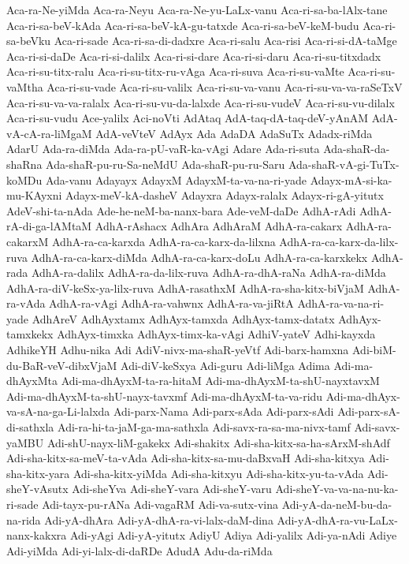 {Aca-ra-Ne-yiMda
Aca-ra-Neyu
Aca-ra-Ne-yu-LaLx-vanu
Aca-ri-sa-ba-lAlx-tane
Aca-ri-sa-beV-kAda
Aca-ri-sa-beV-kA-gu-tatxde
Aca-ri-sa-beV-keM-budu
Aca-ri-sa-beVku
Aca-ri-sade
Aca-ri-sa-di-dadxre
Aca-ri-salu
Aca-risi
Aca-ri-si-dA-taMge
Aca-ri-si-daDe
Aca-ri-si-dalilx
Aca-ri-si-dare
Aca-ri-si-daru
Aca-ri-su-titxdadx
Aca-ri-su-titx-ralu
Aca-ri-su-titx-ru-vAga
Aca-ri-suva
Aca-ri-su-vaMte
Aca-ri-su-vaMtha
Aca-ri-su-vade
Aca-ri-su-valilx
Aca-ri-su-va-vanu
Aca-ri-su-va-va-raSeTxV
Aca-ri-su-va-va-ralalx
Aca-ri-su-vu-da-lalxde
Aca-ri-su-vudeV
Aca-ri-su-vu-dilalx
Aca-ri-su-vudu
Ace-yalilx
Aci-noVti
AdAtaq
AdA-taq-dA-taq-deV-yAnAM
AdA-vA-cA-ra-liMgaM
AdA-veVteV
AdAyx
Ada
AdaDA
AdaSuTx
Adadx-riMda
AdarU
Ada-ra-diMda
Ada-ra-pU-vaR-ka-vAgi
Adare
Ada-ri-suta
Ada-shaR-da-shaRna
Ada-shaR-pu-ru-Sa-neMdU
Ada-shaR-pu-ru-Saru
Ada-shaR-vA-gi-TuTx-koMDu
Ada-vanu
Adayayx
AdayxM
AdayxM-ta-va-na-ri-yade
Adayx-mA-si-ka-mu-KAyxni
Adayx-meV-kA-dasheV
Adayxra
Adayx-ralalx
Adayx-ri-gA-yitutx
AdeV-shi-ta-nAda
Ade-he-neM-ba-nanx-bara
Ade-veM-daDe
AdhA-rAdi
AdhA-rA-di-ga-lAMtaM
AdhA-rAshacx
AdhAra
AdhAraM
AdhA-ra-cakarx
AdhA-ra-cakarxM
AdhA-ra-ca-karxda
AdhA-ra-ca-karx-da-lilxna
AdhA-ra-ca-karx-da-lilx-ruva
AdhA-ra-ca-karx-diMda
AdhA-ra-ca-karx-doLu
AdhA-ra-ca-karxkekx
AdhA-rada
AdhA-ra-dalilx
AdhA-ra-da-lilx-ruva
AdhA-ra-dhA-raNa
AdhA-ra-diMda
AdhA-ra-diV-keSx-ya-lilx-ruva
AdhA-rasathxM
AdhA-ra-sha-kitx-biVjaM
AdhA-ra-vAda
AdhA-ra-vAgi
AdhA-ra-vahwnx
AdhA-ra-va-jiRtA
AdhA-ra-va-na-ri-yade
AdhAreV
AdhAyxtamx
AdhAyx-tamxda
AdhAyx-tamx-datatx
AdhAyx-tamxkekx
AdhAyx-timxka
AdhAyx-timx-ka-vAgi
AdhiV-yateV
Adhi-kayxda
AdhikeYH
Adhu-nika
Adi
AdiV-nivx-ma-shaR-yeVtf
Adi-barx-hamxna
Adi-biM-du-BaR-veV-dibxVjaM
Adi-diV-keSxya
Adi-guru
Adi-liMga
Adima
Adi-ma-dhAyxMta
Adi-ma-dhAyxM-ta-ra-hitaM
Adi-ma-dhAyxM-ta-shU-nayxtavxM
Adi-ma-dhAyxM-ta-shU-nayx-tavxmf
Adi-ma-dhAyxM-ta-va-ridu
Adi-ma-dhAyx-va-sA-na-ga-Li-lalxda
Adi-parx-Nama
Adi-parx-sAda
Adi-parx-sAdi
Adi-parx-sA-di-sathxla
Adi-ra-hi-ta-jaM-ga-ma-sathxla
Adi-savx-ra-sa-ma-nivx-tamf
Adi-savx-yaMBU
Adi-shU-nayx-liM-gakekx
Adi-shakitx
Adi-sha-kitx-sa-ha-sArxM-shAdf
Adi-sha-kitx-sa-meV-ta-vAda
Adi-sha-kitx-sa-mu-daBxvaH
Adi-sha-kitxya
Adi-sha-kitx-yara
Adi-sha-kitx-yiMda
Adi-sha-kitxyu
Adi-sha-kitx-yu-ta-vAda
Adi-sheY-vAsutx
Adi-sheYva
Adi-sheY-vara
Adi-sheY-varu
Adi-sheY-va-va-na-nu-ka-ri-sade
Adi-tayx-pu-rANa
Adi-vagaRM
Adi-va-sutx-vina
Adi-yA-da-neM-bu-da-na-rida
Adi-yA-dhAra
Adi-yA-dhA-ra-vi-lalx-daM-dina
Adi-yA-dhA-ra-vu-LaLx-nanx-kakxra
Adi-yAgi
Adi-yA-yitutx
AdiyU
Adiya
Adi-yalilx
Adi-ya-nAdi
Adiye
Adi-yiMda
Adi-yi-lalx-di-daRDe
AdudA
Adu-da-riMda
}
